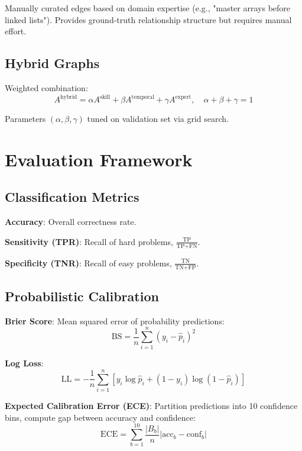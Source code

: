 \documentclass[conference]{IEEEtran}
\begin{document}
Manually curated edges based on domain expertise (e.g., "master arrays before linked lists"). Provides ground-truth relationship structure but requires manual effort.

\subsection{Hybrid Graphs}

Weighted combination:
\begin{equation}
A^{\text{hybrid}} = \alpha A^{\text{skill}} + \beta A^{\text{temporal}} + \gamma A^{\text{expert}}, \quad \alpha + \beta + \gamma = 1
\end{equation}

Parameters $(\alpha, \beta, \gamma)$ tuned on validation set via grid search.

\section{Evaluation Framework}

\subsection{Classification Metrics}

\textbf{Accuracy}: Overall correctness rate.

\textbf{Sensitivity (TPR)}: Recall of hard problems, $\frac{\text{TP}}{\text{TP+FN}}$.

\textbf{Specificity (TNR)}: Recall of easy problems, $\frac{\text{TN}}{\text{TN+FP}}$.

\subsection{Probabilistic Calibration}

\textbf{Brier Score}: Mean squared error of probability predictions:
\begin{equation}
\text{BS} = \frac{1}{n}\sum_{i=1}^{n}(y_i - \hat{p}_i)^2
\end{equation}

\textbf{Log Loss}:
\begin{equation}
\text{LL} = -\frac{1}{n}\sum_{i=1}^{n}[y_i \log \hat{p}_i + (1-y_i)\log(1-\hat{p}_i)]
\end{equation}

\textbf{Expected Calibration Error (ECE)}: Partition predictions into 10 confidence bins, compute gap between accuracy and confidence:
\begin{equation}
\text{ECE} = \sum_{b=1}^{10} \frac{|B_b|}{n} | \text{acc}_b - \text{conf}_b |
\end{equation}
\end{document}
